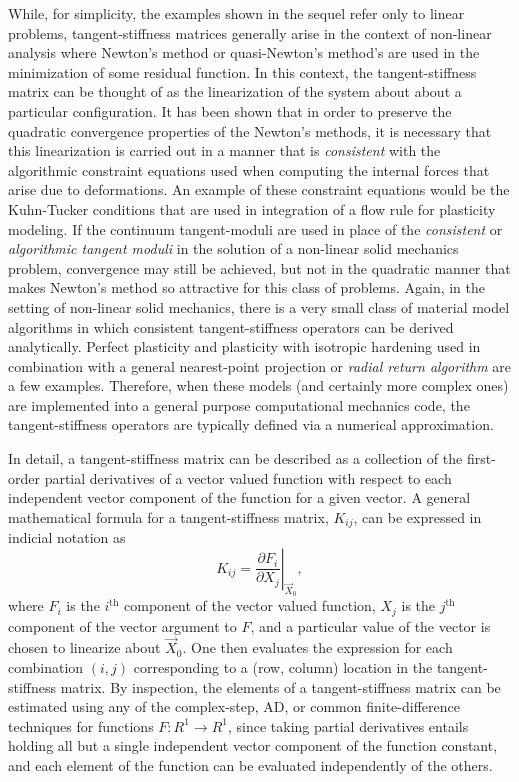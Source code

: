 \documentclass[preprint,12pt]{elsarticle}
\begin{document}
While, for simplicity, the examples shown in the sequel refer only to linear problems, tangent-stiffness matrices generally arise in the context of non-linear analysis where Newton's method or quasi-Newton's method's are used in the minimization of some residual function.  In this context, the tangent-stiffness matrix can be thought of as the linearization of the system about about a particular configuration.  It has been shown \cite{hughes1978consistent, hughes1978unconditionally} that in order to preserve the quadratic convergence properties of the Newton's methods, it is necessary that this linearization is carried out in a manner that is \emph{consistent} with the algorithmic constraint equations used when computing the internal forces that arise due to deformations.  An example of these constraint equations would be the Kuhn-Tucker conditions \cite{simo1998} that are used in integration of a flow rule for plasticity modeling.  If the continuum tangent-moduli are used in place of the \emph{consistent} or \emph{algorithmic tangent moduli} in the solution of a non-linear solid mechanics problem, convergence may still be achieved, but not in the quadratic manner that makes Newton's method so attractive for this class of problems.  Again, in the setting of non-linear solid mechanics, there is a very small class of material model algorithms in which consistent tangent-stiffness operators can be derived analytically.  Perfect plasticity and plasticity with isotropic hardening used in combination with a general nearest-point projection or \emph{radial return algorithm} are a few examples.  Therefore, when these models (and certainly more complex ones) are implemented into a general purpose computational mechanics code, the tangent-stiffness operators are typically defined via a numerical approximation.

In detail, a tangent-stiffness matrix can be described as a collection of the first-order partial derivatives of a vector valued function with respect to each independent vector component of the function for a given vector.   A general mathematical formula for a tangent-stiffness matrix, $K_{ij}$,
can be expressed in indicial notation as 
%
\begin{equation} 
  K_{ij} = \left. \frac{\partial F_i}{\partial X_j}\right|_{\vec{X}_0},
\end{equation}
%
where $F_i$ is the $i^{\mbox{th}}$ component of the vector valued function, $X_j$ is the $j^{\mbox{th}}$ component of the vector argument to $F$, and a particular value of the vector is chosen to linearize about $\vec{X}_0$. One then evaluates the expression for each combination $(i, j)$ corresponding to a (row, column) location in the tangent-stiffness matrix. By inspection, the elements of a tangent-stiffness matrix can be estimated using any of the complex-step, AD, or common finite-difference techniques for functions $F:R^1 \rightarrow R^1$, since taking partial derivatives entails holding all but a single independent vector component of the function constant, and each element of the function can be evaluated independently of the others. \\ 
\end{document}
